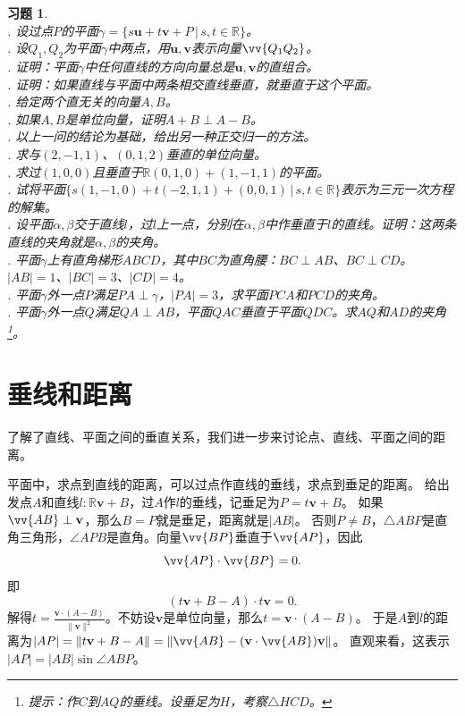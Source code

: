 \documentclass[12pt,UTF8]{ctexbook}
\newtheorem{xt}{习题}[section]
\begin{document}
\begin{xt}
    \mbox{} \\ 
    . 设过点$P$的平面$\gamma = \{s\mathbf{u} + t\mathbf{v} + P \, | \, s,t\in\mathbb{R}\}$。\\
    . 设$Q_1,Q_2$为平面$\gamma$中两点，用$\mathbf{u},\mathbf{v}$表示向量$\vv{Q_1Q_2}$。\\
    . 证明：平面$\gamma$中任何直线的方向向量总是$\mathbf{u},\mathbf{v}$的直组合。\\
    . 证明：如果直线与平面中两条相交直线垂直，就垂直于这个平面。\\     
    . 给定两个直无关的向量$A,B$。\\
    . 如果$A,B$是单位向量，证明$A+B \perp A-B$。\\
    . 以上一问的结论为基础，给出另一种正交归一的方法。\\
    . 求与$(2,-1,1)$、$(0,1,2)$垂直的单位向量。\\
    . 求过$(1,0,0)$且垂直于$\mathbb{R}(0,1,0)+(1,-1,1)$的平面。\\
    . 试将平面$\{s(1,-1,0) + t(-2,1,1) + (0,0,1) \, | \, s,t\in\mathbb{R}\}$表示为三元一次方程的解集。\\
    . 设平面$\alpha, \beta$交于直线$l$，过$l$上一点，分别在$\alpha, \beta$中作垂直于$l$的直线。证明：这两条直线的夹角就是$\alpha, \beta$的夹角。\\
    . 平面$\gamma$上有直角梯形$ABCD$，其中$BC$为直角腰：$BC\perp AB$、$BC\perp CD$。$|AB| = 1$、$|BC| = 3$、$|CD| = 4$。\\
    . 平面$\gamma$外一点$P$满足$PA \perp \gamma$，$|PA| = 3$，求平面$PCA$和$PCD$的夹角。\\
    . 平面$\gamma$外一点$Q$满足$QA \perp AB$，平面$QAC$垂直于平面$QDC$。求$AQ$和$AD$的夹角\footnote{提示：作$C$到$AQ$的垂线。设垂足为$H$，考察$\triangle HCD$。}。
\end{xt}


\section{垂线和距离}
了解了直线、平面之间的垂直关系，我们进一步来讨论点、直线、平面之间的距离。

平面中，求点到直线的距离，可以过点作直线的垂线，求点到垂足的距离。
给出发点$A$和直线$l : \mathbb{R}\mathbf{v} + B$，过$A$作$l$的垂线，记垂足为$P = t\mathbf{v} + B$。
如果$\vv{AB}\perp\mathbf{v}$，那么$B=P$就是垂足，距离就是$|AB|$。
否则$P\neq B$，$\triangle ABP$是直角三角形，$\angle APB$是直角。向量$\vv{BP}$垂直于$\vv{AP}$，因此
$$ \vv{AP}\cdot \vv{BP} = 0.$$
即
$$ (t\mathbf{v} + B - A)\cdot t\mathbf{v} = 0.$$
解得$t = \frac{\mathbf{v}\cdot(A-B)}{\|\mathbf{v}\|^2}$。不妨设$\mathbf{v}$是单位向量，那么$t=\mathbf{v}\cdot(A-B)$。
于是$A$到$l$的距离为$|AP| = \| t\mathbf{v} + B - A\| = \| \vv{AB} - (\mathbf{v}\cdot \vv{AB})\mathbf{v}\|$。
直观来看，这表示$|AP| = |AB|\sin{\angle ABP}$。
\end{document}
